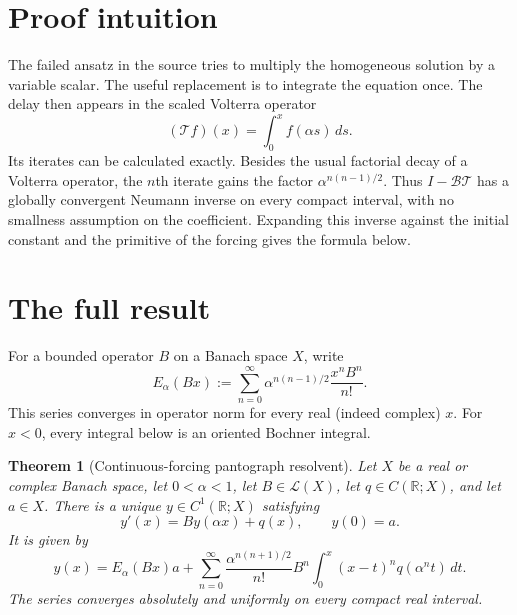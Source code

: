 \documentclass[11pt]{article}
\newtheorem{theorem}{Theorem}
\newcommand{\Bcal}{\mathcal B}
\newcommand{\Tcal}{\mathcal T}
\begin{document}
\section{Proof intuition}

The failed ansatz in the source tries to multiply the homogeneous solution by
a variable scalar.  The useful replacement is to integrate the equation once.
The delay then appears in the scaled Volterra operator
\[
 (\Tcal f)(x)=\int_0^x f(\alpha s)\,ds.
\]
Its iterates can be calculated exactly.  Besides the usual factorial decay of
a Volterra operator, the $n$th iterate gains the factor
$\alpha^{n(n-1)/2}$.  Thus $I-\Bcal\Tcal$ has a globally convergent Neumann
inverse on every compact interval, with no smallness assumption on the
coefficient.  Expanding this inverse against the initial constant and the
primitive of the forcing gives the formula below.

\section{The full result}

For a bounded operator $B$ on a Banach space $X$, write
\begin{equation}\label{eq:operatorE}
 E_\alpha(Bx)
 :=\sum_{n=0}^{\infty}
 \alpha^{n(n-1)/2}\frac{x^n B^n}{n!}.
\end{equation}
This series converges in operator norm for every real (indeed complex) $x$.
For $x<0$, every integral below is an oriented Bochner integral.

\begin{theorem}[Continuous-forcing pantograph resolvent]\label{thm:main}
Let $X$ be a real or complex Banach space, let $0<\alpha<1$, let
$B\in\mathcal L(X)$, let $q\in C(\mathbb R;X)$, and let $a\in X$.  There is a
unique $y\in C^1(\mathbb R;X)$ satisfying
\begin{equation}\label{eq:banach}
 y'(x)=B y(\alpha x)+q(x),\qquad y(0)=a.
\end{equation}
It is given by
\begin{equation}\label{eq:duhamel}
\boxed{
y(x)=E_\alpha(Bx)a+
\sum_{n=0}^{\infty}
\frac{\alpha^{n(n+1)/2}}{n!}B^n
\int_0^x (x-t)^n q(\alpha^n t)\,dt .
}
\end{equation}
The series converges absolutely and uniformly on every compact real interval.
\end{theorem}
\end{document}
